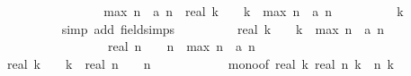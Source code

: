 \begin{isabellebody}
\ \ \ \ \ \ \ \ \isacommand{{\isachardot}}\isamarkupfalse%
\isanewline
\ \ \ \ \ \ \isamarkupfalse%
\ {\isachardoublequoteopen}{\isacharquery}max\ n\ {\isacharminus}\ a\ {\isacharparenleft}n{\isacharminus}{}{\isacharparenright}\ {\isasymle}\ {\isacharparenleft}real\ k\ {\isacharminus}\ {}{\isacharparenright}\ {\isacharslash}\ k\ {\isacharasterisk}\ {\isacharparenleft}{\isacharquery}max\ {\isacharparenleft}n{\isacharminus}{}{\isacharparenright}\ {\isacharminus}\ a\ {\isacharparenleft}n{\isacharminus}{}{\isacharparenright}{\isacharparenright}{\isachardoublequoteclose}\isanewline
\ \ \ \ \ \ \ \ \isamarkupfalse%
\ {\isacharbackquoteopen}k\ {\isasymge}\ {}{\isacharbackquoteclose}\isanewline
\ \ \ \ \ \ \ \ \isamarkupfalse%
\ {\isacharparenleft}simp\ add{\isacharcolon}\ field{\isacharunderscore}simps{\isacharparenright}\isanewline
\ \ \ \ \ \ \isamarkupfalse%
\ \isamarkupfalse%
\ {\isachardoublequoteopen}{\isacharparenleft}real\ k\ {\isacharminus}\ {}{\isacharparenright}\ {\isacharslash}\ k\ {\isacharasterisk}\ {\isacharparenleft}{\isacharquery}max\ {\isacharparenleft}n{\isacharminus}{}{\isacharparenright}\ {\isacharminus}\ a\ {\isacharparenleft}n{\isacharminus}{}{\isacharparenright}{\isacharparenright}\ {\isasymle}\ \isanewline
\ \ \ \ \ \ \ \ \ \ \ \ \ \ \ \ \ {\isacharparenleft}real\ n\ {\isacharminus}\ {}{\isacharparenright}\ {\isacharslash}\ n\ {\isacharasterisk}\ {\isacharparenleft}{\isacharquery}max\ {\isacharparenleft}n{\isacharminus}{}{\isacharparenright}\ {\isacharminus}\ a\ {\isacharparenleft}n{\isacharminus}{}{\isacharparenright}{\isacharparenright}{\isachardoublequoteclose}\isanewline
\ \ \ \ \ \ \isamarkupfalse%
{\isacharminus}\isanewline
\ \ \ \ \ \ \ \ \isamarkupfalse%
\ {\isachardoublequoteopen}{\isacharparenleft}real\ k\ {\isacharminus}\ {}{\isacharparenright}\ {\isacharslash}\ k\ {\isasymle}\ {\isacharparenleft}real\ n\ {\isacharminus}\ {}{\isacharparenright}\ {\isacharslash}\ n{\isachardoublequoteclose}\isanewline
\ \ \ \ \ \ \ \ \ \ \isamarkupfalse%
\ mono{\isacharbrackleft}of\ {\isachardoublequoteopen}real\ k{\isachardoublequoteclose}\ {\isachardoublequoteopen}real\ n{\isachardoublequoteclose}{\isacharbrackright}\ {\isacharbackquoteopen}k\ {\isasymle}\ n{\isacharbackquoteclose}\ {\isacharbackquoteopen}k\ {\isasymge}\ {}{\isacharbackquoteclose}\isanewline

\end{isabellebody}
